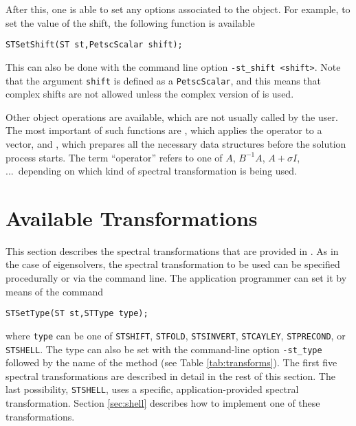 	After this, one is able to set any options associated to the  object. For example, to set the value of the shift, the following function is available
	\begin{Verbatim}[fontsize=\small]
	STSetShift(ST st,PetscScalar shift);
	\end{Verbatim}
	This can also be done with the command line option \Verb!-st_shift <shift>!. Note that the argument \texttt{shift} is defined as a \texttt{PetscScalar}, and this means that complex shifts are not allowed unless the complex version of \slepc is used.

	Other object operations are available, which are not usually called by the user. The most important of such functions are , which applies the operator to a vector, and , which prepares all the necessary data structures before the solution process starts. The term ``operator'' refers to one of $A$, $B^{-1}\!A$, $A+\sigma I$, ...\ depending on which kind of spectral transformation is being used.
 
\section{Available Transformations}

	This section describes the spectral transformations that are provided in \slepc. As in the case of eigensolvers, the spectral transformation to be used can be specified procedurally or via the command line. The application programmer can set it by means of the command
	\begin{Verbatim}[fontsize=\small]
	STSetType(ST st,STType type);
	\end{Verbatim}
where \texttt{type} can be one of 
\texttt{STSHIFT}, \texttt{STFOLD},
\texttt{STSINVERT}, \texttt{STCAYLEY},
\texttt{STPRECOND}, or \texttt{STSHELL}.
The  type can also be set with the command-line option \Verb!-st_type! followed by the name of the method (see Table \ref{tab:transforms}). The first five spectral transformations are described in detail in the rest of this section. The last possibility, \texttt{STSHELL}, uses a specific, application-provided spectral transformation. Section \ref{sec:shell} describes how to implement one of these transformations.

